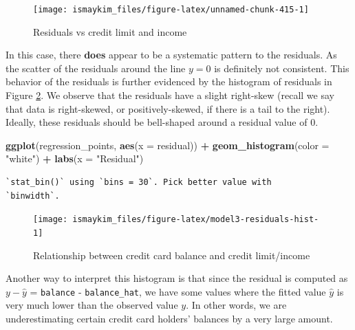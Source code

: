 \documentclass[12pt, krantz2,]{krantz}
\makeatletter
\newenvironment{Shaded}{\begin{snugshade}}{\end{snugshade}}
\newcommand{\DataTypeTok}[1]{\textcolor[rgb]{0.27,0.27,0.27}{#1}}
\newcommand{\KeywordTok}[1]{\textcolor[rgb]{0.27,0.27,0.27}{\textbf{#1}}}
\newcommand{\NormalTok}[1]{#1}
\newcommand{\OperatorTok}[1]{\textcolor[rgb]{0.43,0.43,0.43}{\textbf{#1}}}
\newcommand{\StringTok}[1]{\textcolor[rgb]{0.5,0.5,0.5}{#1}}
\newenvironment{kframe}{%
\medskip{}
\setlength{\fboxsep}{.8em}
 \def\at@end@of@kframe{}%
 \ifinner\ifhmode%
  \def\at@end@of@kframe{\end{minipage}}%
  \begin{minipage}{\columnwidth}%
 \fi\fi%
 \def\FrameCommand##1{\hskip\@totalleftmargin \hskip-\fboxsep
 \colorbox{shadecolor}{##1}\hskip-\fboxsep
     \hskip-\linewidth \hskip-\@totalleftmargin \hskip\columnwidth}%
 \MakeFramed {\advance\hsize-\width
   \@totalleftmargin\z@ \linewidth\hsize
   \@setminipage}}%
 {\par\unskip\endMakeFramed%
 \at@end@of@kframe}
\renewenvironment{Shaded}{\begin{kframe}}{\end{kframe}}
\makeatother
\begin{document}
\begin{figure}

{\centering \texttt{[image: ismaykim\_files/figure-latex/unnamed-chunk-415-1]} 

}

\caption{Residuals vs credit limit and income}\label{fig:unnamed-chunk-415}
\end{figure}

In this case, there \textbf{does} appear to be a systematic pattern to the residuals. As the scatter of the residuals around the line \(y=0\) is definitely not consistent. This behavior of the residuals is further evidenced by the histogram of residuals in Figure \ref{fig:model3-residuals-hist}. We observe that the residuals have a slight right-skew (recall we say that data is right-skewed, or positively-skewed, if there is a tail to the right). Ideally, these residuals should be bell-shaped around a residual value of 0.

\begin{Shaded}
\begin{Highlighting}[]
\KeywordTok{ggplot}\NormalTok{(regression_points, }\KeywordTok{aes}\NormalTok{(}\DataTypeTok{x =}\NormalTok{ residual)) }\OperatorTok{+}
\StringTok{  }\KeywordTok{geom_histogram}\NormalTok{(}\DataTypeTok{color =} \StringTok{"white"}\NormalTok{) }\OperatorTok{+}
\StringTok{  }\KeywordTok{labs}\NormalTok{(}\DataTypeTok{x =} \StringTok{"Residual"}\NormalTok{)}
\end{Highlighting}
\end{Shaded}

\begin{verbatim}
`stat_bin()` using `bins = 30`. Pick better value with
`binwidth`.
\end{verbatim}

\begin{figure}

{\centering \texttt{[image: ismaykim\_files/figure-latex/model3-residuals-hist-1]} 

}

\caption{Relationship between credit card balance and credit limit/income}\label{fig:model3-residuals-hist}
\end{figure}

Another way to interpret this histogram is that since the residual is computed as \(y - \widehat{y}\) = \texttt{balance} - \texttt{balance\_hat}, we have some values where the fitted value \(\widehat{y}\) is very much lower than the observed value \(y\). In other words, we are underestimating certain credit card holders' balances by a very large amount.
\end{document}
